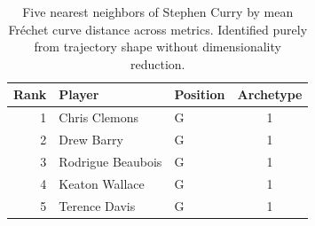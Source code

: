 \begin{table}[htbp]
  \centering\small
  \begin{tabular}{rllc}
    \toprule
    Rank & Player & Position & Archetype \\
    \midrule
    1 & Chris Clemons & G & 1 \\
    2 & Drew Barry & G & 1 \\
    3 & Rodrigue Beaubois & G & 1 \\
    4 & Keaton Wallace & G & 1 \\
    5 & Terence Davis & G & 1 \\
    \bottomrule
  \end{tabular}
  \caption{Five nearest neighbors of Stephen Curry by mean Fr\'{e}chet curve distance across metrics. Identified purely from trajectory shape without dimensionality reduction.}
  \label{tab:Stephen_Curry_frechet_curve_neighbors}
\end{table}

